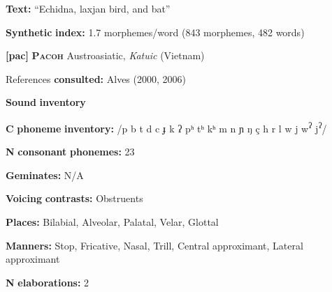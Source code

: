 \begin{styleBody}
\textbf{Text:} “Echidna, laxjan bird, and bat” \citep[493-502]{Loughnane2009}
\end{styleBody}

\begin{styleBody}
\textbf{Synthetic} \textbf{index:} 1.7 morphemes/word (843 morphemes, 482 words)
\end{styleBody}

\begin{styleBody}
\textbf{[pac]}   \textbf{\textsc{Pacoh}}  Austroasiatic, \textit{Katuic} (Vietnam)
\end{styleBody}

\begin{styleBody}
References \textbf{consulted:} Alves (2000, 2006)
\end{styleBody}

\begin{styleBody}
\textbf{Sound} \textbf{inventory}
\end{styleBody}

\begin{styleBody}
\textbf{C} \textbf{phoneme} \textbf{inventory:} /p b t d c ɟ k ʔ pʰ tʰ kʰ m n ɲ ŋ ç h r l w j w\textsuperscript{ʔ} j\textsuperscript{ʔ}/
\end{styleBody}

\begin{styleBody}
\textbf{N} \textbf{consonant} \textbf{phonemes:} 23
\end{styleBody}

\begin{styleBody}
\textbf{Geminates:} N/A
\end{styleBody}

\begin{styleBody}
\textbf{Voicing} \textbf{contrasts:} Obstruents
\end{styleBody}

\begin{styleBody}
\textbf{Places:} Bilabial, Alveolar, Palatal, Velar, Glottal
\end{styleBody}

\begin{styleBody}
\textbf{Manners:} Stop, Fricative, Nasal, Trill, Central approximant, Lateral approximant
\end{styleBody}

\begin{styleBody}
\textbf{N} \textbf{elaborations:} 2
\end{styleBody}

